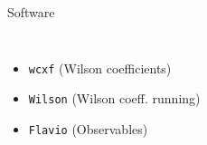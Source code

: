 \begin{frame}{Software}
\begin{columns}
\begin{itemize}
            \item {} \texttt{wcxf} {\footnotesize(Wilson coefficients)}
            \item {} \texttt{Wilson} {\footnotesize(Wilson coeff. running)}
            \item {} \texttt{Flavio} {\footnotesize(Observables)}
        \end{itemize}
     \end{columns}
\end{frame}

